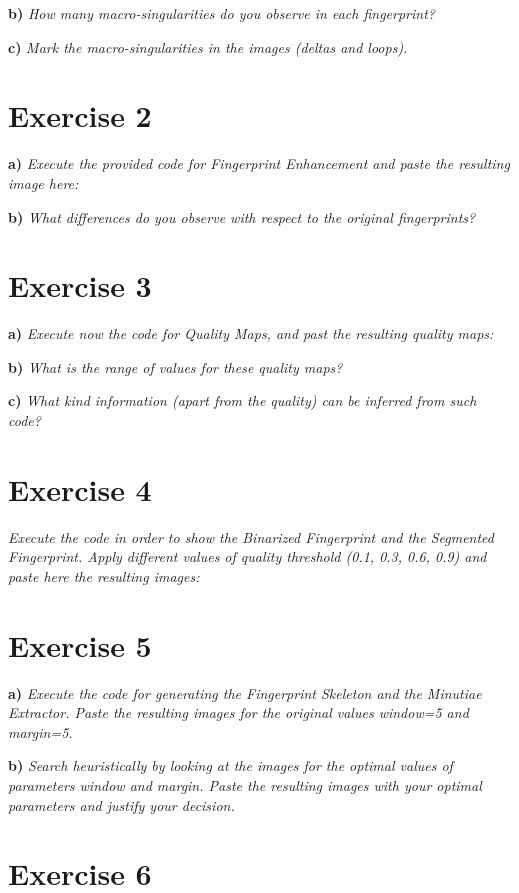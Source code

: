 \documentclass[11pt]{article}
\begin{document}
\textbf{b) } \emph{How many macro-singularities do you observe in each fingerprint?}

\textbf{c) } \emph{Mark the macro-singularities in the images (deltas and loops).}

\section{Exercise 2}

\textbf{a) }\emph{Execute the provided code for Fingerprint Enhancement and paste the resulting image here:}

\textbf{b) }\emph{What differences do you observe with respect to the original fingerprints?}

\section{Exercise 3}

\textbf{a) }\emph{Execute now the code for Quality Maps, and past the resulting quality maps:}

\textbf{b) }\emph{What is the range of values for these quality maps?}

\textbf{c) }\emph{What kind information (apart from the quality) can be inferred from such code?}

\section{Exercise 4}

\emph{Execute the code in order to show the Binarized Fingerprint and the Segmented Fingerprint. Apply different values of quality threshold (0.1, 0.3, 0.6, 0.9) and paste here the resulting images:}

\section{Exercise 5}

\textbf{a) }\emph{Execute the code for generating the Fingerprint Skeleton and the Minutiae Extractor. Paste the resulting images for the original values window=5 and margin=5.}

\textbf{b) }\emph{Search heuristically by looking at the images for the optimal values of parameters window and margin. Paste the resulting images with your optimal parameters and justify your decision.}

\section{Exercise 6}
\end{document}
